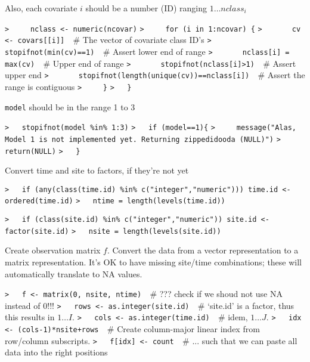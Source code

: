 \documentclass[a4paper]{article}
\begin{document}
Also, each covariate $i$ should be a number (ID) ranging $1\ldots nclass_i$\par
\verb~>     nclass <- numeric(ncovar)~\newline
\verb~>     for (i in 1:ncovar) {~\newline
\verb~>       cv <- covars[[i]]  ~{\sffamily\# The vector of covariate class ID's}\newline
\verb~>       stopifnot(min(cv)==1)  ~{\sffamily\# Assert lower end of range}\newline
\verb~>       nclass[i] = max(cv)  ~{\sffamily\# Upper end of range}\newline
\verb~>       stopifnot(nclass[i]>1)  ~{\sffamily\# Assert upper end}\newline
\verb~>       stopifnot(length(unique(cv))==nclass[i])  ~{\sffamily\# Assert the range is contiguous}\newline
\verb~>     }~\newline
\verb~>   }~\par

\verb!model! should be in the range 1 to 3\par
\verb~>   stopifnot(model %in% 1:3)~\newline
\verb~>   if (model==1){~\newline
\verb~>     message("Alas, Model 1 is not implemented yet. Returning zippedidooda (NULL)")~\newline
\verb~>     return(NULL)~\newline
\verb~>   }~\par
Convert time and site to factors, if they're not yet\par
\verb~>   if (any(class(time.id) %in% c("integer","numeric"))) time.id <- ordered(time.id)~\newline
\verb~>   ntime = length(levels(time.id))~\par

\verb~>   if (class(site.id) %in% c("integer","numeric")) site.id <- factor(site.id)~\newline
\verb~>   nsite = length(levels(site.id))~\par

Create observation matrix $f$.
Convert the data from a vector representation to a matrix representation.
It's OK to have missing site/time combinations; these will automatically
translate to NA values.\par
\verb~>   f <- matrix(0, nsite, ntime)  ~{\sffamily\# ??? check if we shoud not use NA instead of 0!!!}\newline
\verb~>   rows <- as.integer(site.id)  ~{\sffamily\# `site.id' is a factor, thus this results in $1\ldots I$.}\newline
\verb~>   cols <- as.integer(time.id)  ~{\sffamily\# idem, $1 \ldots J$.}\newline
\verb~>   idx <- (cols-1)*nsite+rows  ~{\sffamily\# Create column-major linear index from row/column subscripts.}\newline
\verb~>   f[idx] <- count  ~{\sffamily\# ... such that we can paste all data into the right positions}\par
\end{document}
